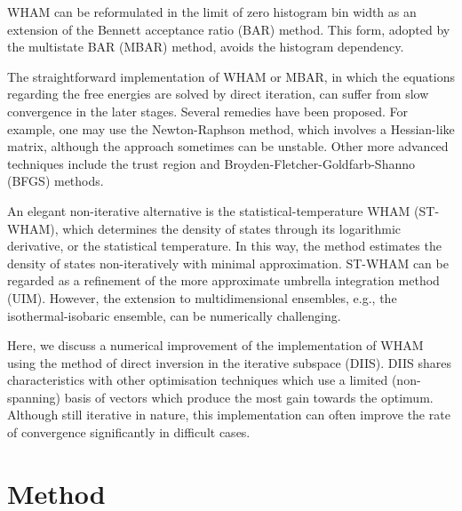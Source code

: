 \documentclass{gMOS2e}
\begin{document}
WHAM can be
reformulated\cite{
shirts2008}
in the limit of zero histogram bin width
as an extension
of the Bennett acceptance ratio (BAR) method\cite{
bennett1976}.
%
%
This form,
adopted by the multistate BAR (MBAR) method\cite{
shirts2008},
avoids the histogram dependency\cite{
kumar1992, souaille2001, shirts2008}.



The straightforward implementation of WHAM or MBAR,
in which the equations regarding the free energies
are solved by direct iteration,
can suffer from
slow convergence in the later stages.
%
Several remedies have been proposed\cite{
shirts2008, fenwick2008, bereau2009, kim2011, zhu2012}.
%
For example, one may use the Newton-Raphson method,
which involves a Hessian-like matrix,
although the approach sometimes can be unstable\cite{
shirts2008}.
%
%
Other more advanced techniques include
the trust region and Broyden-Fletcher-Goldfarb-Shanno (BFGS) methods\cite{zhu2012}.



An elegant non-iterative alternative is
the statistical-temperature WHAM (ST-WHAM)\cite{
fenwick2008, kim2011}, which
determines the density of states
through its logarithmic derivative,
or the statistical temperature.
%
In this way,
the method estimates
the density of states non-iteratively
with minimal approximation.
%
ST-WHAM can be regarded as a refinement of
the more approximate umbrella integration method (UIM)\cite{
kastner2005, kastner2009}.
%
However, the extension to multidimensional ensembles,
e.g., the isothermal-isobaric ensemble,
can be numerically challenging\cite{kim2011}.



Here, we discuss a numerical improvement of
the implementation of WHAM using
the method of direct inversion in the iterative subspace (DIIS)\cite{
pulay1980, pulay1982, hamilton1986,
kovalenko1999, howard2011}.
%
DIIS shares characteristics with other optimisation techniques which use a limited (non-spanning) basis of vectors which produce the most gain towards the optimum.
%
Although still iterative in nature,
this implementation
can often improve
the rate of convergence
significantly in difficult cases.





\section{Method}
\end{document}
